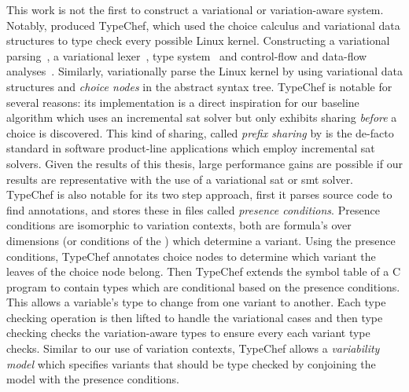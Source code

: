 This work is not the first to construct a variational or variation-aware system.
Notably, \citet{LKA+:ESECFSE13} produced TypeChef, which used the choice
calculus and variational data structures to type check every possible Linux
kernel. Constructing a variational parsing~\cite{KGR+:OOPSLA11}, a variational
lexer~\cite{Kastner11partialpreprocessing}, type
system~\cite{LKA+:ESECFSE13,KOE:OOPSLA12} and control-flow and data-flow
analyses~\cite{LKA+:ESECFSE13}. Similarly, \citet{GG:PLDI12} variationally parse
the Linux kernel by using variational data structures and \emph{choice nodes} in
the abstract syntax tree. TypeChef is notable for several reasons: its
implementation is a direct inspiration for our baseline algorithm \vTop{} which
uses an incremental \ac{sat} solver but only exhibits sharing \emph{before} a
choice is discovered. This kind of sharing, called \emph{prefix sharing} by
\citet{SE17fosd} is the de-facto standard in software product-line applications
which employ incremental \ac{sat} solvers. Given the results of this thesis,
large performance gains are possible if our results are representative with the
use of a variational \ac{sat} or \ac{smt} solver. TypeChef is also notable for
its two step approach, first it parses source code to find 
annotations, and stores these in files called \emph{presence conditions}.
Presence conditions are isomorphic to variation contexts, both are \pl{}
formula's over dimensions (or conditions of the ) which determine a
variant. Using the presence conditions, TypeChef annotates choice nodes to
determine which variant the leaves of the choice node belong. Then TypeChef
extends the symbol table of a C program to contain types which are conditional
based on the presence conditions. This allows a variable's type to change from
one variant to another. Each type checking operation is then lifted to handle
the variational cases and then type checking checks the variation-aware types to
ensure every each variant type checks. Similar to our use of variation contexts,
TypeChef allows a \emph{variability model} which specifies variants that should
be type checked by conjoining the model with the presence conditions.


